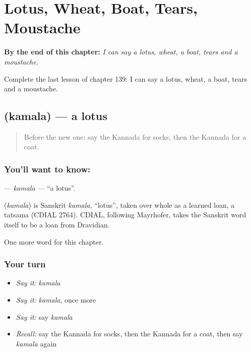 
\chapter{Lotus, Wheat, Boat, Tears, Moustache}
\label{ch:ka-lotus-wheat-boat-tears-moustache}

\begin{chapteropening}
\textbf{By the end of this chapter:} \emph{I can say a lotus, wheat, a boat, tears and a moustache.}

Complete the last lesson of chapter 139: I can say a lotus, wheat, a boat, tears and a moustache.
\end{chapteropening}

\section[\texorpdfstring{\kn{ಕಮಲ} (kamala)}{ಕಮಲ (kamala)}]{ (kamala) — a lotus}

\label{lesson:KA-C139-kamala}



\begin{quote}
Before the new one: say the Kannada for socks, then the Kannada for a coat.
\end{quote}

\subsection*{You'll want to know: }
\textbf{} — \emph{kamala} — \textquotedblleft{}a lotus\textquotedblright{}.

\begin{cousinweb}
\textbf{} (\emph{kamala}) is Sanskrit \emph{kamala}, \textquotedblleft{}lotus\textquotedblright{}, taken over whole as a learned loan, a tatsama (CDIAL 2764). CDIAL, following Mayrhofer, takes the Sanskrit word itself to be a loan from Dravidian.
\end{cousinweb}

\begin{grammarlens}[title={What you've built}]
One more word for this chapter.
\end{grammarlens}

\subsection*{Your turn}
\begin{itemize}
\raggedright
  \item \emph{Say it:} \emph{kamala}
  \item \emph{Say it:} \emph{kamala}, once more
  \item \emph{Say it:} say \emph{kamala}
  \item \emph{Recall:} say the Kannada for socks, then the Kannada for a coat, then say \emph{kamala} again
\end{itemize}

